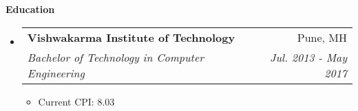 \documentclass[letterpaper,12pt]{article}
\makeatletter
\newcommand{\resitem}[1]{\item #1 \vspace{-2pt}}
\newcommand{\resheading}[1]{{\large \colorbox{mygrey}{\begin{minipage}{\textwidth}{\textbf{#1 \vphantom{p\^{E}}}}\end{minipage}}}}
\newcommand{\ressubheading}[4]{
  \begin{tabular*}{7.0in}{l@{\extracolsep{\fill}}r}
    \textbf{#1} & #2 \\
    \textit{#3} & \textit{#4} \\
  \end{tabular*}\vspace{-6pt}}
\newif\ifhighschool
\makeatother
\begin{document}
\resheading{Education}
\begin{itemize}
\item
  \ressubheading{Vishwakarma Institute of Technology}{Pune, MH}{Bachelor of Technology in Computer Engineering}{Jul. 2013 - May 2017}
  \begin{itemize}
    \resitem{Current CPI: 8.03}
  \end{itemize}
  \ifhighschool	
\item
  \ressubheading{Delhi Public School}{Pune, MH}{12th Grade CBSE}{May 2013}
  \begin{itemize}
    \resitem{Percentage: 76.4\%}
  \end{itemize}
\item
  \ressubheading{Delhi Public School}{Pune, MH}{10th Grade CBSE}{May 2011}
  \begin{itemize}
    \resitem{CGPA: 8.6}
  \end{itemize}
  \fi
\end{itemize}

\ifhighschool
\pagebreak
\fi
\end{document}
